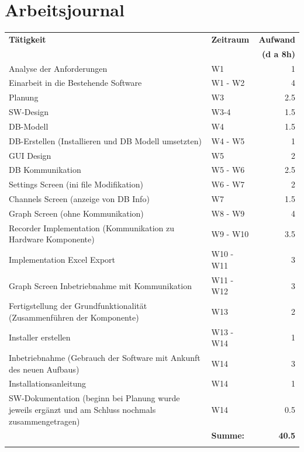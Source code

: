 \documentclass[10pt]{scrartcl}
\begin{document}
\section{Arbeitsjournal}
\begin{center}
	\begin{tabular}{p{6cm} | l | r}
		\textbf{Tätigkeit} & \textbf{Zeitraum} & \textbf{Aufwand} \\ &&\textbf{(d a 8h)}\\
		\hline Analyse der Anforderungen & W1 & 1 \\
		\hline Einarbeit in die Bestehende Software & W1 - W2 & 4 \\
		\hline Planung & W3 & 2.5 \\
		\hline SW-Design & W3-4 & 1.5 \\
		\hline DB-Modell & W4 & 1.5 \\
		\hline DB-Erstellen (Installieren und DB Modell umsetzten) & W4 - W5 & 1 \\
		\hline GUI Design & W5 & 2 \\
		\hline DB Kommunikation & W5 - W6 & 2.5 \\
		\hline Settings Screen (ini file Modifikation) & W6 - W7 & 2 \\
		\hline Channels Screen (anzeige von DB Info) & W7 & 1.5 \\
		\hline Graph Screen (ohne Kommunikation) & W8 - W9 & 4 \\
		\hline Recorder Implementation (Kommunikation zu Hardware Komponente) & W9 - W10 & 3.5 \\
		\hline Implementation Excel Export & W10 - W11 & 3 \\
		\hline Graph Screen Inbetriebnahme mit Kommunikation & W11 - W12 & 3 \\
		\hline Fertigstellung der Grundfunktionalität (Zusammenführen der Komponente) & W13 & 2 \\
		\hline Installer erstellen & W13 - W14 & 1 \\
		\hline Inbetriebnahme (Gebrauch der Software mit Ankunft des neuen Aufbaus) & W14 & 3 \\
		\hline Installationsanleitung & W14 & 1 \\
		\hline SW-Dokumentation (beginn bei Planung wurde jeweils ergänzt und am Schluss nochmals zusammengetragen) & W14 & 0.5 \\\hhline{~--}
		& \textbf{Summe:} & \textbf{40.5} \\\hhline{~~=}
	\end{tabular}
\end{center}
\end{document}
